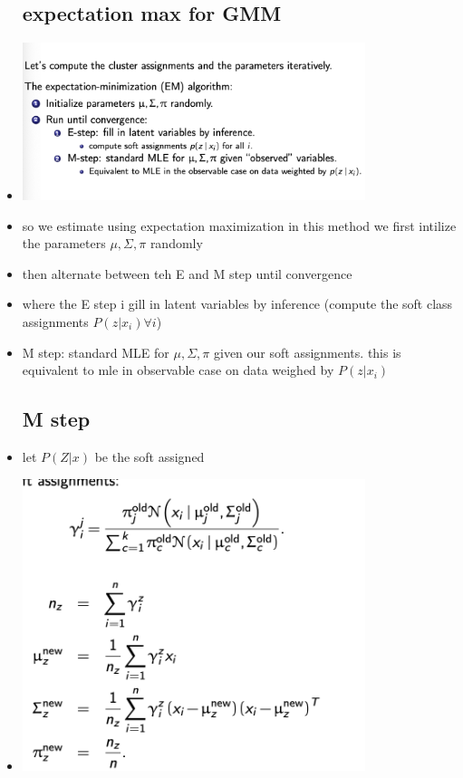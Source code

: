 \documentclass{article}
\begin{document}
\begin{itemize}
\subsection*{expectation max for GMM}
\item \includegraphics*[width=10cm]{images/Screenshot 2023-05-15 at 2.45.02 AM.png}
\item so we estimate using expectation maximization in this method we first intilize the parameters $\mu, \Sigma, \pi$ randomly 
\item then alternate between teh E and M step until convergence 
\item where the E step i gill in latent variables by inference (compute the soft class assignments $P(z|x_i)\forall i$) 
\item M step: standard MLE for $\mu, \Sigma, \pi$ given our soft assignments. this is equivalent to mle in observable case on data weighed by $P(z|x_i )$  
\subsection*{M step}
\item let $P(Z|x)$ be the soft assigned 
\item \includegraphics*[width=10cm]{images/Screenshot 2023-05-15 at 2.50.04 AM.png}

\end{itemize}
\end{document}
